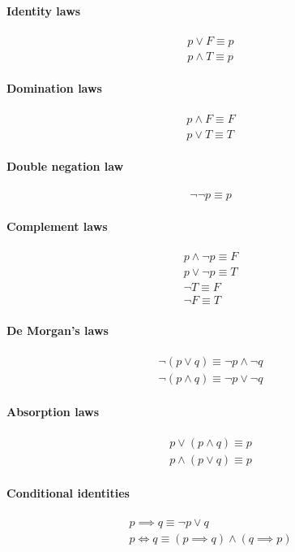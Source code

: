 \documentclass[a4paper]{article}
\begin{document}
\paragraph{Identity laws}
\begin{align*}
 p \lor F \equiv p \\
 p \land T \equiv p
\end{align*}
\paragraph{Domination laws}
\begin{align*}
 p \land F \equiv F \\
 p \lor T \equiv T
\end{align*}
\paragraph{Double negation law}
\begin{align*}
 \lnot \lnot p \equiv p
\end{align*}
\paragraph{Complement laws}
\begin{align*}
 p \land \lnot p \equiv F \\
 p \lor \lnot p \equiv T \\
 \lnot T \equiv F \\
 \lnot F \equiv T
\end{align*}
\paragraph{De Morgan's laws}
\begin{align*}
  \lnot (p \lor q) \equiv \lnot p \land \lnot q \\
  \lnot (p \land q) \equiv \lnot p \lor \lnot q
\end{align*}
\paragraph{Absorption laws}
\begin{align*}
 p \lor (p \land q) \equiv p \\
 p \land (p \lor q) \equiv p
\end{align*}
\paragraph{Conditional identities}
\begin{align*}
  p \implies q \equiv \lnot p \lor q \\
  p \iff q \equiv (p \implies q) \land (q \implies p)
\end{align*}
\end{document}
